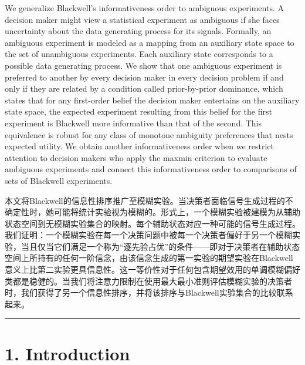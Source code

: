 \documentclass[12pt,a4paper]{article}
\newenvironment{original}
  {\par\vspace{4pt}\noindent\color{black}\ignorespaces}
  {\par\vspace{2pt}}
\newenvironment{translation}
  {\par\vspace{2pt}\noindent\color{myblue}\ignorespaces}
  {\par\vspace{6pt}}
\newcommand{\bisection}[2]{%
  \section{#1}%
  \vspace{-2pt}%
  \noindent{\color{myblue}\large\bfseries #2}%
  \vspace{6pt}%
}
\begin{document}
\begin{original}
We generalize Blackwell's informativeness order to ambiguous experiments. A decision maker might view a statistical experiment as ambiguous if she faces uncertainty about the data generating process for its signals. Formally, an ambiguous experiment is modeled as a mapping from an auxiliary state space to the set of unambiguous experiments. Each auxiliary state corresponds to a possible data generating process. We show that one ambiguous experiment is preferred to another by every decision maker in every decision problem if and only if they are related by a condition called prior-by-prior dominance, which states that for any first-order belief the decision maker entertains on the auxiliary state space, the expected experiment resulting from this belief for the first experiment is Blackwell more informative than that of the second. This equivalence is robust for any class of monotone ambiguity preferences that nests expected utility. We obtain another informativeness order when we restrict attention to decision makers who apply the maxmin criterion to evaluate ambiguous experiments and connect this informativeness order to comparisons of sets of Blackwell experiments.
\end{original}

\begin{translation}
本文将Blackwell的信息性排序推广至模糊实验。当决策者面临信号生成过程的不确定性时，她可能将统计实验视为模糊的。形式上，一个模糊实验被建模为从辅助状态空间到无模糊实验集合的映射。每个辅助状态对应一种可能的信号生成过程。我们证明：一个模糊实验在每一个决策问题中被每一个决策者偏好于另一个模糊实验，当且仅当它们满足一个称为“逐先验占优”的条件——即对于决策者在辅助状态空间上所持有的任何一阶信念，由该信念生成的第一实验的期望实验在Blackwell意义上比第二实验更具信息性。这一等价性对于任何包含期望效用的单调模糊偏好类都是稳健的。当我们将注意力限制在使用最大最小准则评估模糊实验的决策者时，我们获得了另一个信息性排序，并将该排序与Blackwell实验集合的比较联系起来。
\end{translation}

\bigskip
\vspace{8pt}
\hrule
\vspace{4pt}


\bisection{1. Introduction}{1. 引言}
\end{document}
